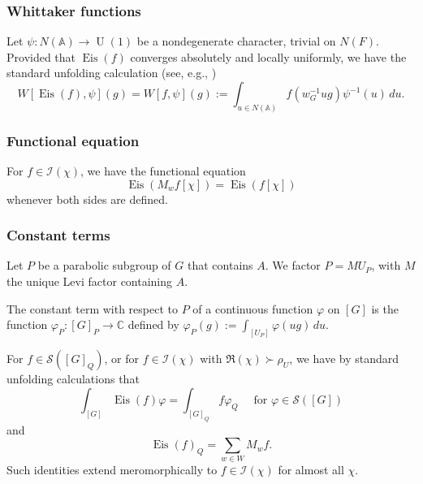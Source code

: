 \documentclass[reqno]{amsart}
\DeclareMathOperator{\U}{U}
\DeclareMathOperator{\Eis}{Eis}
\theoremstyle{plain} \newtheorem{theorem} {Theorem}
\theoremstyle{definition} \newtheorem{definition} [theorem] {Definition}
\theoremstyle{itplain} %
\numberwithin{equation}{section}
\numberwithin{theorem}{section}
\begin{document}
\subsubsection{Whittaker functions}\label{sec:whittaker-functions}
Let $\psi : N(\mathbb{A}) \rightarrow \U(1)$ be a nondegenerate character, trivial on $N(F)$.  Provided that $\Eis(f)$ converges absolutely and locally uniformly, we have the standard unfolding calculation (see, e.g., \cite[Prop 7.1.3]{MR2683009})
\begin{equation}\label{eq:weisf-psig-=}
  W[\Eis(f),\psi](g) = W[f,\psi](g) := \int _{u \in  N(\mathbb{A})} f(w_G^{-1} u g) \psi^{-1}(u) \, d u.
\end{equation}

\subsubsection{Functional equation}
For $f \in \mathcal{I}(\chi)$, we have the functional equation
\begin{equation}\label{eq:eisenstein-series-functional-equation}
  \Eis(M_w f[\chi]) = \Eis(f[\chi])
\end{equation}
whenever both sides are defined.  


\subsubsection{Constant terms}\label{sec:constant-terms}
Let $P$ be a parabolic subgroup of $G$ that contains $A$.  We factor $P = M U_P$, with $M$ the unique Levi factor containing $A$.

The constant term with respect to $P$ of a continuous function $\varphi$ on $[G]$ is the function $\varphi_P : [G]_P \rightarrow \mathbb{C}$ defined by $\varphi_P(g) := \int _{[U_P]} \varphi(u g) \, d u$.


For $f \in \mathcal{S}([G]_Q)$, or for $f \in \mathcal{I}(\chi)$ with $\Re(\chi) \succ \rho_U$, we have by standard unfolding calculations \cite[p101 and \S II.1.7]{MR1361168} that
\begin{equation}\label{eq:int_g-eisf-varphi}
  \int_{[G]} \Eis(f) \varphi = \int_{[G]_Q} f \varphi_Q \quad \text{ for } \varphi \in \mathcal{S}([G])
\end{equation}
and
\begin{equation}\label{eq:eisf_b-=-sum}
  \Eis(f)_Q = \sum _{w \in W} M_w f.
\end{equation}
Such identities extend meromorphically to $f \in \mathcal{I}(\chi)$ for almost all $\chi$.
\end{document}
